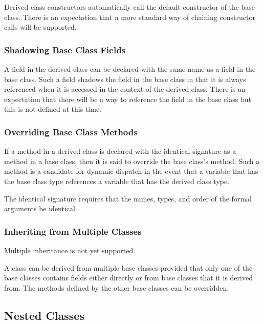 Derived class constructors automatically call the default constructor
of the base class.  There is an expectation that a more standard way
of chaining constructor calls will be supported.

\subsubsection{Shadowing Base Class Fields}
\label{Shadowing_Base_Class_Fields}

A field in the derived class can be declared with the same name as a
field in the base class.  Such a field shadows the field in the base
class in that it is always referenced when it is accessed in the
context of the derived class.  There is an expectation that there will
be a way to reference the field in the base class but this is not
defined at this time.

\subsubsection{Overriding Base Class Methods}
\label{Overriding_Base_Class_Methods}

If a method in a derived class is declared with the identical
signature as a method in a base class, then it is said to override the
base class's method.  Such a method is a candidate for dynamic
dispatch in the event that a variable that has the base class type
references a variable that has the derived class type.

The identical signature requires that the names, types, and order of
the formal arguments be identical.

\subsubsection{Inheriting from Multiple Classes}
\label{Inheriting_from_Multiple_Classes}

\begin{status}
Multiple inheritance is not yet supported.
\end{status}

A class can be derived from multiple base classes provided that only
one of the base classes contains fields either directly or from base
classes that it is derived from.  The methods defined by the other
base classes can be overridden.

\subsection{Nested Classes}
\label{Nested_Classes}

